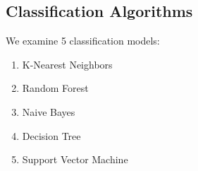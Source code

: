 \documentclass[runningheads]{llncs}
\begin{document}
\subsection{Classification Algorithms}




We examine 5 classification models:

\begin{enumerate}
  \item K-Nearest Neighbors \cite{fix1989discriminatory}
  \item Random Forest \cite{ho1995random}
  \item Naive Bayes \cite{hand2001idiot}
  \item Decision Tree \cite{loh2011classification}
  \item Support Vector Machine \cite{cortes1995support}
\end{enumerate}
\end{document}
